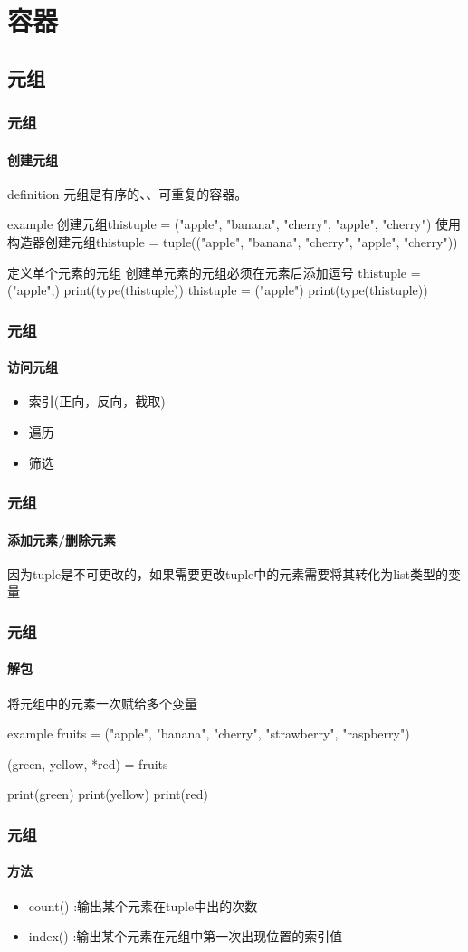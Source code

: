 \documentclass{beamer}
\begin{document}
\section{容器}

\subsection{元组}

\begin{frame}
	\frametitle{元组}
	\framesubtitle{创建元组}
	\begin{block}{definition}
		元组是有序的、、可重复的容器。
	\end{block}
	\pause
	\begin{block}{example}
		创建元组thistuple = ("apple", "banana", "cherry", "apple", "cherry")
		使用构造器创建元组thistuple = tuple(("apple", "banana", "cherry", "apple", "cherry"))
	\end{block}
	\pause
	\begin{alertblock}{定义单个元素的元组}
		创建单元素的元组必须在元素后添加逗号
		thistuple = ("apple",)
		print(type(thistuple))
		thistuple = ("apple")
		print(type(thistuple))
	\end{alertblock}

\end{frame}
\begin{frame}
	\frametitle{元组}
	\framesubtitle{访问元组}
	\begin{itemize}
		\item 索引(正向，反向，截取)
		\item 遍历
		\item 筛选
	\end{itemize}
\end{frame}

\begin{frame}
	\frametitle{元组}
	\framesubtitle{添加元素/删除元素}
	因为tuple是不可更改的，如果需要更改tuple中的元素需要将其转化为list类型的变量

\end{frame}

\begin{frame}
	\frametitle{元组}
	\framesubtitle{解包}
	将元组中的元素一次赋给多个变量
	\begin{block}{example}
		fruits = ("apple", "banana", "cherry", "strawberry", "raspberry")

		(green, yellow, *red) = fruits

		print(green)
		print(yellow)
		print(red)
	\end{block}
\end{frame}
\begin{frame}[t]
	\frametitle{元组}
	\framesubtitle{方法}
	\begin{itemize}
		\item count() :输出某个元素在tuple中出的次数
		\item index() :输出某个元素在元组中第一次出现位置的索引值
	\end{itemize}

\end{frame}
\end{document}
